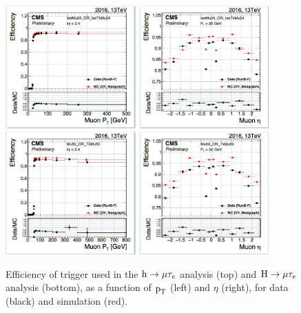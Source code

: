 \begin{figure}[!htpb]\centering
 \includegraphics[width=0.9\textwidth,trim=0 -15pt 0 0,clip]{plots_and_figures/chapter3/muontrig1.png}\\
 \includegraphics[width=0.9\textwidth]{plots_and_figures/chapter3/muontrig2.png} 
\caption{Efficiency of trigger used in the $\text{h} \to \mu \tau_{e}$ analysis (top) and $\text{H} \to \mu \tau_{e}$ analysis (bottom), as a function of $\text{p}_\text{T}$ (left) and $\eta$ (right), for data (black) and simulation (red).}
 \label{fig:muon_trigger}
\end{figure}  



